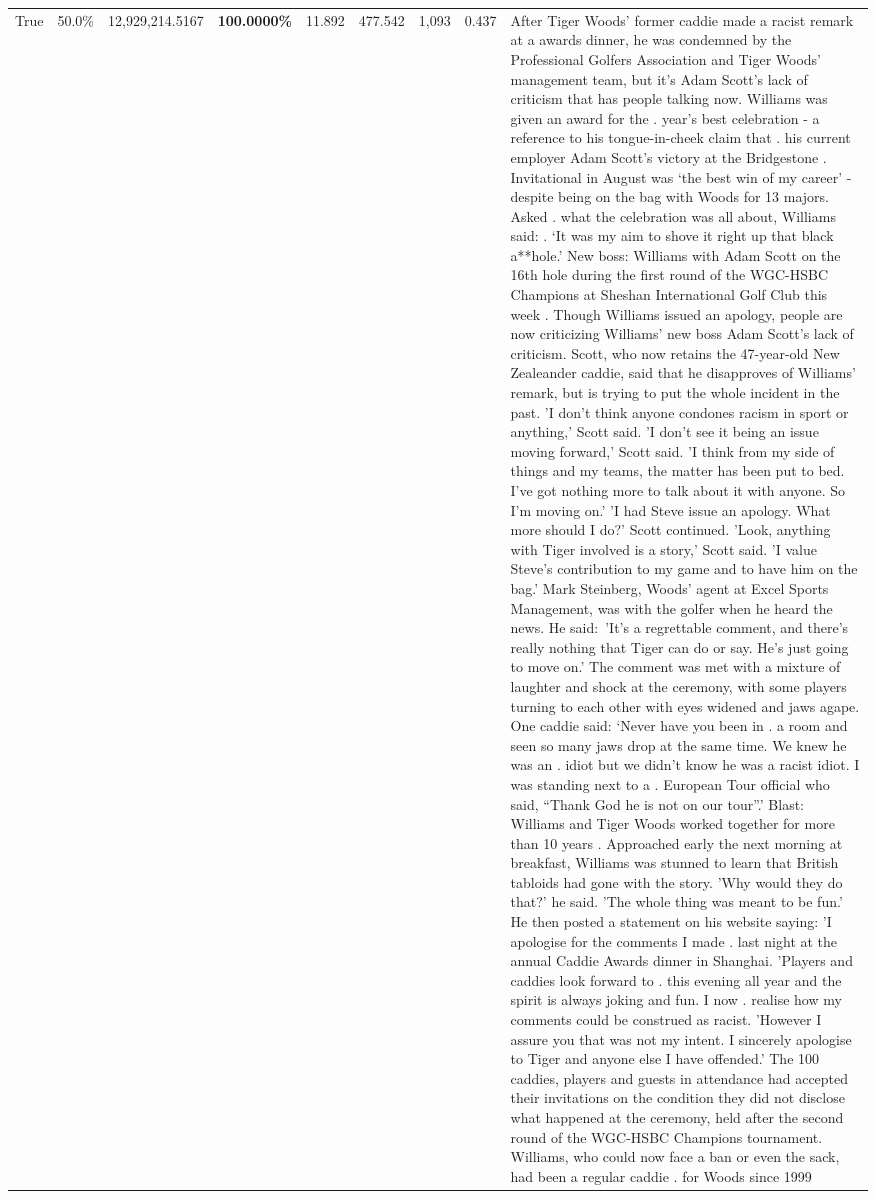 \begin{table}[H]
\begin{tabular}{lllrlllll}
True & 50.0\% & 12,929,214.5167 & \bfseries \color{red} 100.0000\% & 11.892 & 477.542 & 1,093 & 0.437 & After Tiger Woods' former caddie made a racist remark at a awards dinner, he was condemned by the Professional Golfers Association and Tiger Woods' management team, but it's Adam Scott's lack of criticism that has people talking now. Williams was given an award for the . year’s best celebration - a reference to his tongue-in-cheek claim that . his current employer Adam Scott’s victory at the Bridgestone . Invitational in August was ‘the best win of my career’ - despite being on the bag with Woods for 13 majors. Asked . what the celebration was all about, Williams said: . ‘It was my aim to shove it right up that black a**hole.’ New boss: Williams with Adam Scott  on the 16th hole during the first round of the WGC-HSBC Champions at Sheshan International Golf Club this week . Though Williams issued an apology, people are now criticizing Williams' new boss Adam Scott's lack of criticism. Scott, who now retains the 47-year-old New Zealeander caddie, said that he disapproves of Williams' remark, but is trying to put the whole incident in the past. 'I don't think anyone condones racism in sport or anything,' Scott said. 'I don't see it being an issue moving forward,' Scott said. 'I think from my side of things and my teams, the matter has been put to bed. I've got nothing more to talk about it with anyone. So I'm moving on.' 'I had Steve issue an apology. What more should I do?' Scott continued. 'Look, anything with Tiger involved is a story,' Scott said. 'I value Steve's contribution to my game and to have him on the bag.' Mark Steinberg, Woods' agent at Excel Sports Management, was with the golfer when he heard the news. He said: 'It's a regrettable comment, and there's really nothing that Tiger can do or say. He's just going to move on.' The comment was met with a mixture of laughter and shock at the ceremony, with some players turning to each other with eyes widened and jaws agape. One caddie said: ‘Never have you been in . a room and seen so many jaws drop at the same time. We knew he was an . idiot but we didn’t know he was a racist idiot. I was standing next to a . European Tour official who said, “Thank God he is not on our tour”.’ Blast: Williams and Tiger Woods worked together for more than 10 years . Approached early the next morning at breakfast, Williams was stunned to learn that British tabloids had gone with the story. 'Why would they do that?' he said. 'The whole thing was meant to be fun.' He then posted a statement on his website saying: 'I apologise for the comments I made . last night at the annual Caddie Awards dinner in Shanghai. 'Players and caddies look forward to . this evening all year and the spirit is always joking and fun. I now . realise how my comments could be construed as racist. 'However I assure you that was not my intent. I sincerely apologise to Tiger and anyone else I have offended.' The 100 caddies, players and guests in attendance had accepted their invitations on the condition they did not disclose what happened at the ceremony, held after the second round of the WGC-HSBC Champions tournament. Williams, who could now face a ban or even the sack, had been a regular caddie . for Woods since 1999 
\end{tabular}
\end{table}

